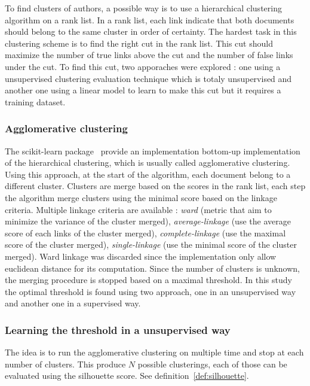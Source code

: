 To find clusters of authors, a possible way is to use a hierarchical clustering algorithm on a rank list.
In a rank list, each link indicate that both documents should belong to the same cluster in order of certainty.
The hardest task in this clustering scheme is to find the right cut in the rank list.
This cut should maximize the number of true links above the cut and the number of false links under the cut.
To find this cut, two apporaches were explored : one using a unsupervised clustering evaluation technique which is totaly unsupervised and another one using a linear model to learn to make this cut but it requires a training dataset.

\subsubsection{Agglomerative clustering}

The scikit-learn package~\cite{sklearn} provide an implementation bottom-up implementation of the hierarchical clustering, which is usually called agglomerative clustering.
Using this approach, at the start of the algorithm, each document belong to a different cluster.
Clusters are merge based on the scores in the rank list, each step the algorithm merge clusters using the minimal score based on the linkage criteria.
Multiple linkage criteria are available : \textit{ward} (metric that aim to minimize the variance of the cluster merged), \textit{average-linkage} (use the average score of each links of the cluster merged), \textit{complete-linkage} (use the maximal score of the cluster merged), \textit{single-linkage} (use the minimal score of the cluster merged).
Ward linkage was discarded since the implementation only allow euclidean distance for its computation.
Since the number of clusters is unknown, the merging procedure is stopped based on a maximal threshold.
In this study the optimal threshold is found using two approach, one in an unsupervised way and another one in a supervised way.

\subsubsection{Learning the threshold in a unsupervised way}

The idea is to run the agglomerative clustering on multiple time and stop at each number of clusters.
This produce $N$ possible clusterings, each of those can be evaluated using the silhouette score.
See definition~\ref{def:silhouette}.

